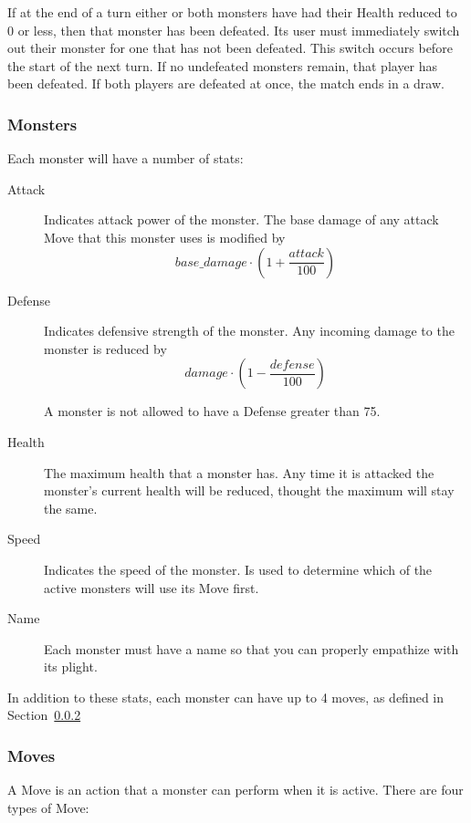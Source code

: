 \documentclass[11pt]{cselabheader}
\begin{document}
If at the end of a turn either or both monsters have had their Health reduced to 0
or less, then that monster has been defeated. Its user must immediately switch out
their monster for one that has not been defeated. This switch occurs before the start
of the next turn. If no undefeated monsters remain, that player has been defeated.
If both players are defeated at once, the match ends in a draw.

\subsubsection{Monsters}
\label{subsubsec:monster}  
Each monster will have a number of stats:
\begin{description}
\item[Attack] Indicates attack power of the monster. The base damage of any attack
  Move that this monster uses is modified by $$base\_damage \cdot \left(1 +
  \frac{attack}{100}\right)$$
\item[Defense] Indicates defensive strength of the monster. Any incoming damage to
  the monster is reduced by $$damage \cdot \left(1 - \frac{defense}{100}\right)$$

  A monster is not allowed to have a Defense greater than 75.
\item[Health] The maximum health that a monster has. Any time it is attacked the
  monster's current health will be reduced, thought the maximum will stay the same.
\item[Speed] Indicates the speed of the monster. Is used to determine which of the
  active monsters will use its Move first.
\item[Name] Each monster must have a name so that you can properly empathize with
  its plight.
\end{description}


In addition to these stats, each monster can have up to 4 moves, as defined in
Section~\ref{subsubsec:moves}

\subsubsection{Moves}
\label{subsubsec:moves}
A Move is an action that a monster can perform when it is active. There are four
types of Move:
\end{document}
